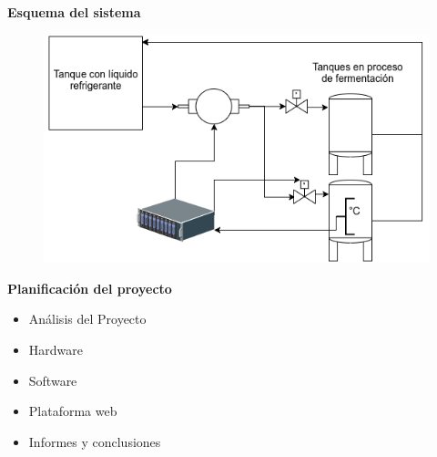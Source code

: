 \documentclass[11pt]{beamer}
\begin{document}
\begin{frame}{\textbf{\LARGE{Esquema del sistema}}}
  \vspace{-.7cm}
  \begin{figure}[H]
    {\includegraphics[width=1\textwidth]{./imagenes/diagrama_del_sistema.png}}
  \end{figure}	
\end{frame}


\begin{frame}{\textbf{\LARGE{Planificación del proyecto }}}
  \fontsize{18pt}{18}\selectfont
  \begin{itemize}
    \item Análisis del Proyecto
      \vspace{10px}
    \item Hardware
      \vspace{10px}
    \item Software
      \vspace{10px}
    \item Plataforma web
      \vspace{10px}
    \item Informes y conclusiones
  \end{itemize}	
\end{frame}
\end{document}
